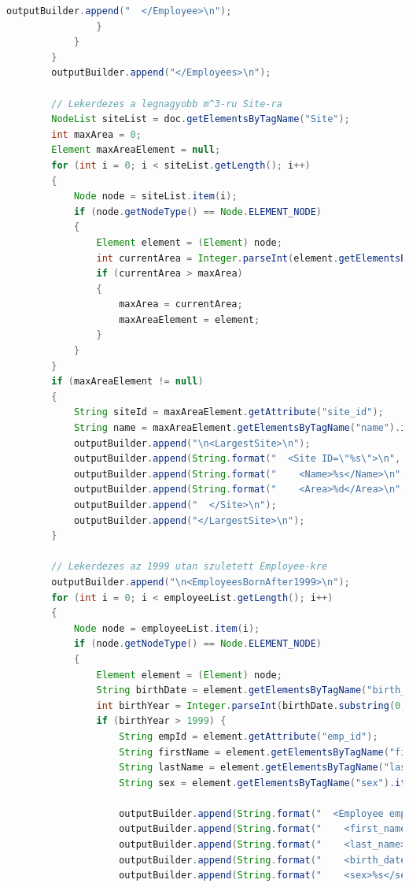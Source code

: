 \documentclass[12pt]{report}
\begin{document}
\begin{lstlisting}[caption={DOMQueryKLNSPG.java} adatlekérdező program, language=Java]
					outputBuilder.append("  </Employee>\n");
				}
			}
		}
		outputBuilder.append("</Employees>\n");
		
		// Lekerdezes a legnagyobb m^3-ru Site-ra
		NodeList siteList = doc.getElementsByTagName("Site");
		int maxArea = 0;
		Element maxAreaElement = null;
		for (int i = 0; i < siteList.getLength(); i++) 
		{
			Node node = siteList.item(i);
			if (node.getNodeType() == Node.ELEMENT_NODE) 
			{
				Element element = (Element) node;
				int currentArea = Integer.parseInt(element.getElementsByTagName("area").item(0).getTextContent());
				if (currentArea > maxArea) 
				{
					maxArea = currentArea;
					maxAreaElement = element;
				}
			}
		}
		if (maxAreaElement != null) 
		{
			String siteId = maxAreaElement.getAttribute("site_id");
			String name = maxAreaElement.getElementsByTagName("name").item(0).getTextContent();
			outputBuilder.append("\n<LargestSite>\n");
			outputBuilder.append(String.format("  <Site ID=\"%s\">\n", siteId));
			outputBuilder.append(String.format("    <Name>%s</Name>\n", name));
			outputBuilder.append(String.format("    <Area>%d</Area>\n", maxArea));
			outputBuilder.append("  </Site>\n");
			outputBuilder.append("</LargestSite>\n");
		}
		
		// Lekerdezes az 1999 utan szuletett Employee-kre
		outputBuilder.append("\n<EmployeesBornAfter1999>\n");
		for (int i = 0; i < employeeList.getLength(); i++) 
		{
			Node node = employeeList.item(i);
			if (node.getNodeType() == Node.ELEMENT_NODE) 
			{
				Element element = (Element) node;
				String birthDate = element.getElementsByTagName("birth_date").item(0).getTextContent();
				int birthYear = Integer.parseInt(birthDate.substring(0, 4));
				if (birthYear > 1999) {
					String empId = element.getAttribute("emp_id");
					String firstName = element.getElementsByTagName("first_name").item(0).getTextContent();
					String lastName = element.getElementsByTagName("last_name").item(0).getTextContent();
					String sex = element.getElementsByTagName("sex").item(0).getTextContent();
					
					outputBuilder.append(String.format("  <Employee emp_id=\"%s\">\n", empId));
					outputBuilder.append(String.format("    <first_name>%s</first_name>\n", firstName));
					outputBuilder.append(String.format("    <last_name>%s</last_name>\n", lastName));
					outputBuilder.append(String.format("    <birth_date>%s</birth_date>\n", birthDate));
					outputBuilder.append(String.format("    <sex>%s</sex>\n", sex));
					

\end{lstlisting}
\end{document}
